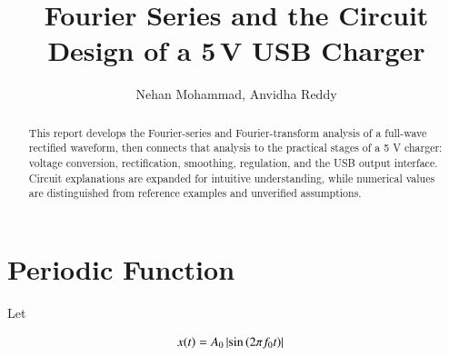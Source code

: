 \documentclass[journal,12pt,twocolumn]{IEEEtran}
\begin{document}
\makeatletter
{}
\makeatother

\let\StandardTheFigure\thefigure
\renewcommand{\thefigure}{\theproblem}

\def\putbox#1#2#3{
    \makebox[0in][l]{
        \makebox[#1][l]{}
        \raisebox{\baselineskip}[0in][0in]{
            \raisebox{#2}[0in][0in]{#3}
        }
    }
}
\def\rightbox#1{\makebox[0in][r]{#1}}
\def\centbox#1{\makebox[0in]{#1}}
\def\topbox#1{\raisebox{-\baselineskip}[0in][0in]{#1}}
\def\midbox#1{\raisebox{-0.5\baselineskip}[0in][0in]{#1}}

\vspace{3cm}

\title{Fourier Series and the Circuit Design of a 5\,V USB Charger}
\author{Nehan Mohammad, Anvidha Reddy}

\maketitle
\tableofcontents

\renewcommand{\thefigure}{\theenumi}
\renewcommand{\thetable}{\theenumi}

\bigskip

\begin{abstract}
This report develops the Fourier-series and Fourier-transform analysis of a
full-wave rectified waveform, then connects that analysis to the practical
stages of a 5 V charger: voltage conversion, rectification, smoothing,
regulation, and the USB output interface. Circuit explanations are expanded
for intuitive understanding, while numerical values are distinguished from
reference examples and unverified assumptions.
\end{abstract}

\section{Periodic Function}

Let

\begin{align}
    x(t) &= A_0\left\vert\sin\left(2\pi f_0t\right)\right\vert
    \label{eq:10-orig-diff-def}
\end{align}
\end{document}
